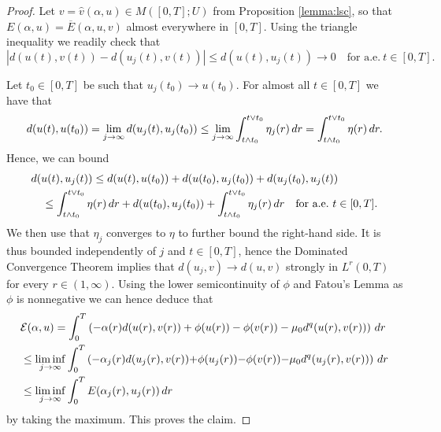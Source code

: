 \documentclass[10pt,a4paper]{amsart}
\newcommand{\dr}{{\rm d} r}
\newcommand{\ove}{\overline}
\newcommand{\haz}{\widehat}
\newcommand{\EE}{{\mathcal E}}
\renewcommand{\d}{{\rm d}}
\begin{document}
\begin{proof} 
  Let $ v = \haz v(\alpha,u) \in M([0,T];U)$ from Proposition
  \ref{lemma:lsc}, so that $ E(\alpha,u) =
  \ove E(\alpha,u, v)$  almost everywhere in  $[0,T]$.
 Using the triangle inequality
  we readily check that
$$|d(u(t), v (t)) - d(u_j(t), v(t))| \leq d(u(t),u_j(t))\to 0
\quad  \text{for a.e.} \ t \in [0,T].$$
 
   Let $t_0\in [0,T]$ be such that $u_j(t_0)\to u(t_0)$. For almost all $t \in [0,T]$ we have that
  $$d(u(t),u(t_0)) = \lim_{j\to \infty}d(u_j(t),u_j(t_0)) \leq  \lim_{j \to \infty} \int_{t\wedge t_0}^{t\vee t_0} \eta_j(r) \,\d r =  \int_{t\wedge t_0}^{t\vee t_0} \eta(r)\, \d r. $$
Hence, we can bound
\begin{align*}
  &d(u(t),u_j(t)) \leq  d(u(t),u(t_0)) + d(u(t_0),u_j(t_0)) +
 d(u_j(t_0),u_j(t))  \\
  &\quad  \leq \int_{t\wedge t_0}^{t\vee t_0} \eta (r)\, \dr +  d(u(t_0),u_j(t_0)) + \int_{t\wedge t_0}^{t\vee t_0} 
     \eta_j (r)\, \d r  \quad \text{for a.e.} \ t \in [0,T].
\end{align*}
We then use that $\eta_j$  converges  to  $\eta$ to further bound  the right-hand side. It is thus bounded independently of $j$ and $t
\in [0,T]$, hence the
Dominated Convergence Theorem implies that $d(u_j, v) \to
d(u, v)$ strongly in  $L^r(0,T)$  for every $r \in (1,\infty)$.   
  Using the lower semicontinuity of $\phi$ and Fatou's Lemma  as
  $ \phi  $ is nonnegative  we can
  hence  deduce that 
  \begin{align*}
    &\EE(\alpha,u) = \int_0^T
    \left(-\alpha(r)d(u(r), v(r))+\phi(u(r)) - \phi( v (r))
    -  \mu_0  d^q(u(r), v (r)) \right)\, \dr \\
    &\leq \liminf_{j\to \infty} \int_0^T
    \left(-\alpha_j(r)d(u_j(r), v(r)){+}\phi(u_j(r)) {-} \phi( v (r))
     {-}  \mu_0  d^q(u_j(r), v (r))  \right)\, \dr \\
    & \leq \liminf_{j\to \infty} \int_0^T  E
    (\alpha_j(r),u_j (r))\, \dr
  \end{align*}
   by taking the maximum. This proves  the claim.
\end{proof}
\end{document}
